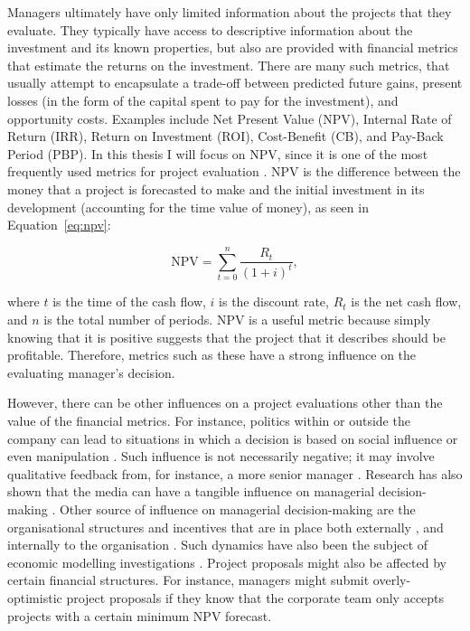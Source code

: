 \documentclass[a4paper, nobind, dvipsnames]{templates/ociamthesis}
\theoremstyle{definition}
\theoremstyle{definition}
\theoremstyle{definition}
\theoremstyle{definition}
\theoremstyle{remark}
\begin{document}
Managers ultimately have only limited information about the projects that they
evaluate. They typically have access to descriptive information about the
investment and its known properties, but also are provided with financial
metrics that estimate the returns on the investment. There are many such
metrics, that usually attempt to encapsulate a trade-off between predicted
future gains, present losses (in the form of the capital spent to pay for the
investment), and opportunity costs. Examples include Net Present Value (NPV),
Internal Rate of Return (IRR), Return on Investment (ROI), Cost-Benefit (CB),
and Pay-Back Period (PBP). In this thesis I will focus on NPV, since it is one
of the most frequently used metrics for project evaluation \autocite{graham2001,remer1993}. NPV is the difference between the money that a project is
forecasted to make and the initial investment in its development (accounting for
the time value of money), as seen in Equation~\eqref{eq:npv}:

\begin{equation}
\text{NPV}=\sum_{t=0}^n \frac{R_t}{(1+i)^t}, \label{eq:npv}
\end{equation}

where \(t\) is the time of the cash flow, \(i\) is the discount rate, \(R_t\) is the
net cash flow, and \(n\) is the total number of periods. NPV is a useful metric
because simply knowing that it is positive suggests that the project that it
describes should be profitable. Therefore, metrics such as these have a strong
influence on the evaluating manager's decision.

However, there can be other influences on a project evaluations other than the
value of the financial metrics. For instance, politics within or outside the
company can lead to situations in which a decision is based on social influence
or even manipulation \autocite{garbuio2017}. Such influence is not necessarily negative; it may involve
qualitative feedback from, for instance, a more senior manager \autocite{thamhain2014}.
Research has also shown that the media can have a tangible influence on
managerial decision-making \autocite{bednar2013,liu2013}. Other source of influence on
managerial decision-making are the organisational structures and incentives that
are in place both externally \autocite{kokkinis2019}, and internally to the organisation
\autocite{ullrich2004}. Such dynamics have also been the subject of economic modelling
investigations \autocite{reichelstein1997,cavagnac2005,ortner2017}. Project
proposals might also be affected by certain financial structures. For instance,
managers might submit overly-optimistic project proposals if they know that the
corporate team only accepts projects with a certain minimum NPV forecast.
\end{document}
